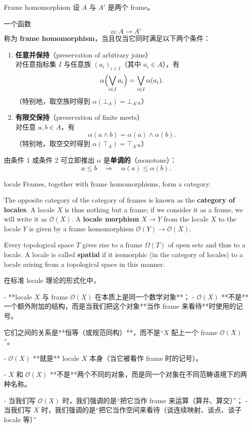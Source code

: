 \documentclass{beamer}
\begin{document}
\begin{frame}{Frame homomorphism}
设 $A$ 与 $A'$ 是两个 frame。

一个函数
$$
\alpha : A \to A'
$$
称为 \textbf{frame homomorphism}，当且仅当它同时满足以下两个条件：

\begin{enumerate}
  \item \textbf{任意并保持}（preservation of arbitrary joins）\\
  对任意指标集 $I$ 与任意族 $(a_i)_{i\in I}$（其中 $a_i\in A$），有
  $$
  \alpha\Bigl(\bigvee_{i\in I} a_i\Bigr) = \bigvee_{i\in I} \alpha(a_i).
  $$
  （特别地，取空族时得到 $\alpha(\bot_A)=\bot_{A'}$。）

  \item \textbf{有限交保持}（preservation of finite meets）\\
  对任意 $a,b\in A$，有
  $$
  \alpha(a\wedge b)=\alpha(a)\wedge\alpha(b).
  $$
  （特别地，取空交时得到 $\alpha(\top_A)=\top_{A'}$。）
\end{enumerate}

由条件 1 或条件 2 可立即推出 $\alpha$ 是\textbf{单调的}（monotone）：
$$
a\leq b\quad\Longrightarrow\quad\alpha(a)\leq\alpha(b).
$$
\end{frame}

\begin{frame}{locale}
Frames, together with frame homomorphisms, form a category.

The opposite category of the category of frames is known as the \textbf{category of locales}. A locale $X$ is thus nothing but a frame; if we consider it as a frame, we will write it as $\mathcal{O}(X)$. A \textbf{locale morphism} $X \to Y$ from the locale $X$ to the locale $Y$ is given by a frame homomorphism $\mathcal{O}(Y) \to \mathcal{O}(X)$.

Every topological space $T$ gives rise to a frame $\Omega(T)$ of open sets and thus to a locale. A locale is called \textbf{spatial} if it isomorphic (in the category of locales) to a locale arising from a topological space in this manner.
\end{frame}

\begin{frame}[fragile]
\begin{markdown}
在标准 locale 理论的形式化中，

- **locale $X$ 与 frame $\mathcal{O}(X)$ 在本质上是同一个数学对象**；
- $\mathcal{O}(X)$ **不是**一个额外附加的结构，而是当我们把这个对象**当作 frame 来看待**时使用的记号。

它们之间的关系是**恒等（或规范同构）**，而不是“$X$ 配上一个 frame $\mathcal{O}(X)$”。

- $\mathcal{O}(X)$ **就是** locale $X$ 本身（当它被看作 frame 时的记号）。  

- $X$ 和 $\mathcal{O}(X)$ **不是**两个不同的对象，而是同一个对象在不同范畴语境下的两种名称。

- 当我们写 $\mathcal{O}(X)$ 时，我们强调的是“把它当作 frame 来运算（算并、算交）”；
- 当我们写 $X$ 时，我们强调的是“把它当作空间来看待（谈连续映射、谈点、谈子locale 等）”
\end{markdown}
\end{frame}
\end{document}
